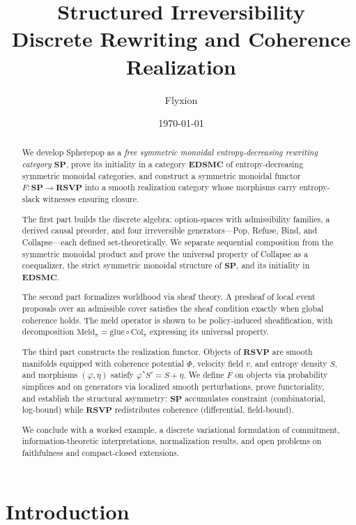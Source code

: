 \documentclass[12pt,a4paper]{article}
\title{\textbf{Structured Irreversibility}\\
\large Discrete Rewriting and Coherence Realization}
\author{Flyxion}
\date{\today}
\theoremstyle{definition}
\theoremstyle{remark}
\newcommand{\SP}{\mathbf{SP}}
\newcommand{\RSVP}{\mathbf{RSVP}}
\newcommand{\EDSMC}{\mathbf{EDSMC}}
\newcommand{\Col}{\ensuremath{\mathrm{Col}}}
\newcommand{\Meld}{\mathrm{Meld}}
\newcommand{\PhiF}{\Phi}
\newcommand{\vF}{v}
\newcommand{\SF}{S}
\begin{document}
\maketitle

\begin{abstract}
We develop Spherepop as a \emph{free symmetric monoidal entropy-decreasing rewriting
category} $\SP$, prove its initiality in a category $\EDSMC$ of entropy-decreasing
symmetric monoidal categories, and construct a symmetric monoidal functor
$F:\SP\to\RSVP$ into a smooth realization category whose morphisms carry
entropy-slack witnesses ensuring closure.

The first part builds the discrete algebra: option-spaces with admissibility
families, a derived causal preorder, and four irreversible generators---Pop,
Refuse, Bind, and Collapse---each defined set-theoretically. We separate
sequential composition from the symmetric monoidal product and prove the
universal property of Collapse as a coequalizer, the strict symmetric monoidal
structure of $\SP$, and its initiality in $\EDSMC$.

The second part formalizes worldhood via sheaf theory. A presheaf of local
event proposals over an admissible cover satisfies the sheaf condition exactly
when global coherence holds. The meld operator is shown to be policy-induced
sheafification, with decomposition $\Meld_\pi=\mathrm{glue}\circ\Col_\pi$
expressing its universal property.

The third part constructs the realization functor. Objects of $\RSVP$ are
smooth manifolds equipped with coherence potential $\PhiF$, velocity field
$\vF$, and entropy density $\SF$, and morphisms $(\varphi,\eta)$ satisfy
$\varphi^*\SF'=\SF+\eta$. We define $F$ on objects via probability simplices
and on generators via localized smooth perturbations, prove functoriality,
and establish the structural asymmetry: $\SP$ accumulates constraint
(combinatorial, log-bound) while $\RSVP$ redistributes coherence
(differential, field-bound).

We conclude with a worked example, a discrete variational formulation of
commitment, information-theoretic interpretations, normalization results,
and open problems on faithfulness and compact-closed extensions.
\end{abstract}

\tableofcontents
\newpage

\section{Introduction}
\label{sec:intro}
\end{document}
